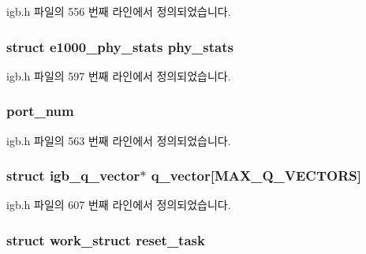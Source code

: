 igb.\+h 파일의 556 번째 라인에서 정의되었습니다.

\subsubsection[{\texorpdfstring{phy\+\_\+stats}{phy_stats}}]{\setlength{\rightskip}{0pt plus 5cm}struct {\bf e1000\+\_\+phy\+\_\+stats} phy\+\_\+stats}\hypertarget{structigb__adapter_a822fe24ef28cf3be85e1d9597a11c6d3}{}\label{structigb__adapter_a822fe24ef28cf3be85e1d9597a11c6d3}


igb.\+h 파일의 597 번째 라인에서 정의되었습니다.

\subsubsection[{\texorpdfstring{port\+\_\+num}{port_num}}]{ port\+\_\+num}\hypertarget{structigb__adapter_ab89764d4931eca8a703e4864c390e725}{}\label{structigb__adapter_ab89764d4931eca8a703e4864c390e725}


igb.\+h 파일의 563 번째 라인에서 정의되었습니다.

\subsubsection[{\texorpdfstring{q\+\_\+vector}{q_vector}}]{\setlength{\rightskip}{0pt plus 5cm}struct {\bf igb\+\_\+q\+\_\+vector}$\ast$ q\+\_\+vector\mbox{[}{\bf M\+A\+X\+\_\+\+Q\+\_\+\+V\+E\+C\+T\+O\+RS}\mbox{]}}\hypertarget{structigb__adapter_a5853a9971831230abae4ae9a1afc0c0b}{}\label{structigb__adapter_a5853a9971831230abae4ae9a1afc0c0b}


igb.\+h 파일의 607 번째 라인에서 정의되었습니다.

\subsubsection[{\texorpdfstring{reset\+\_\+task}{reset_task}}]{\setlength{\rightskip}{0pt plus 5cm}struct work\+\_\+struct reset\+\_\+task}\hypertarget{structigb__adapter_a9f5bf98ace0cecae82cbc96104d62981}{}\label{structigb__adapter_a9f5bf98ace0cecae82cbc96104d62981}


